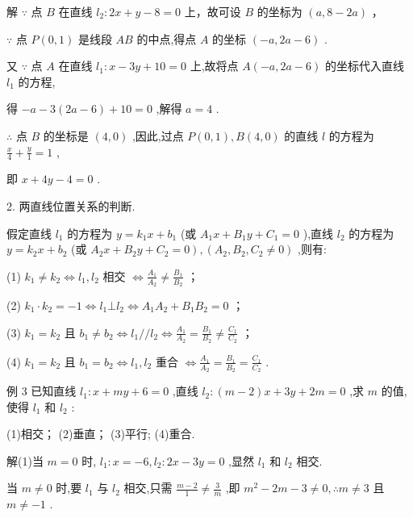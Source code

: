 \documentclass[10pt]{article}
\begin{document}
解 \(\because\) 点 \(B\) 在直线 \({l}_{2} : {2x} + y - 8 = 0\) 上，故可设 \(B\) 的坐标为 \(\left( {a,8 - {2a}}\right)\) ，

\(\because\) 点 \(P\left( {0,1}\right)\) 是线段 \({AB}\) 的中点,得点 \(A\) 的坐标 \(\left( {-a,{2a} - 6}\right)\) .

又 \(\because\) 点 \(A\) 在直线 \({l}_{1} : x - {3y} + {10} = 0\) 上,故将点 \(A\left( {-a,{2a} - 6}\right)\) 的坐标代入直线 \({l}_{1}\) 的方程,

得 \(- a - 3\left( {{2a} - 6}\right)  + {10} = 0\) ,解得 \(a = 4\) .

\(\therefore\) 点 \(B\) 的坐标是 \(\left( {4,0}\right)\) ,因此,过点 \(P\left( {0,1}\right) ,B\left( {4,0}\right)\) 的直线 \(l\) 的方程为 \(\frac{x}{4} + \frac{y}{1} = 1\) ,

即 \(x + {4y} - 4 = 0\) .

2. 两直线位置关系的判断.

假定直线 \({l}_{1}\) 的方程为 \(y = {k}_{1}x + {b}_{1}\) (或 \({A}_{1}x + {B}_{1}y + {C}_{1} = 0\) ),直线 \({l}_{2}\) 的方程为 \(y = {k}_{2}x + {b}_{2}\) (或 \(\left. {{A}_{2}x + {B}_{2}y + {C}_{2} = 0}\right) ,\left( {{A}_{2},{B}_{2},{C}_{2} \neq  0}\right)\) ,则有:

(1) \({k}_{1} \neq  {k}_{2} \Leftrightarrow  {l}_{1},{l}_{2}\) 相交 \(\Leftrightarrow  \frac{{A}_{1}}{{A}_{2}} \neq  \frac{{B}_{1}}{{B}_{2}}\) ；

(2) \({k}_{1} \cdot  {k}_{2} =  - 1 \Leftrightarrow  {l}_{1} \bot  {l}_{2} \Leftrightarrow  {A}_{1}{A}_{2} + {B}_{1}{B}_{2} = 0\) ；

(3) \({k}_{1} = {k}_{2}\) 且 \({b}_{1} \neq  {b}_{2} \Leftrightarrow  {l}_{1}//{l}_{2} \Leftrightarrow  \frac{{A}_{1}}{{A}_{2}} = \frac{{B}_{1}}{{B}_{2}} \neq  \frac{{C}_{1}}{{C}_{2}}\) ；

(4) \({k}_{1} = {k}_{2}\) 且 \({b}_{1} = {b}_{2} \Leftrightarrow  {l}_{1},{l}_{2}\) 重合 \(\Leftrightarrow  \frac{{A}_{1}}{{A}_{2}} = \frac{{B}_{1}}{{B}_{2}} = \frac{{C}_{1}}{{C}_{2}}\) .

例 3 已知直线 \({l}_{1} : x + {my} + 6 = 0\) ,直线 \({l}_{2} : \left( {m - 2}\right) x + {3y} + {2m} = 0\) ,求 \(m\) 的值,使得 \({l}_{1}\) 和 \({l}_{2}\) :

(1)相交； (2)垂直； (3)平行; (4)重合.

解(1)当 \(m = 0\) 时, \({l}_{1} : x =  - 6,{l}_{2} : {2x} - {3y} = 0\) ,显然 \({l}_{1}\) 和 \({l}_{2}\) 相交.

当 \(m \neq  0\) 时,要 \({l}_{1}\) 与 \({l}_{2}\) 相交,只需 \(\frac{m - 2}{1} \neq  \frac{3}{m}\) ,即 \({m}^{2} - {2m} - 3 \neq  0,\therefore m \neq  3\) 且 \(m \neq   - 1\) .
\end{document}
